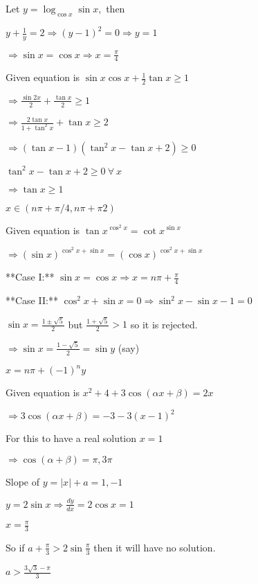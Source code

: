   Let $y = \log_{\cos x}\sin x,$ then

  $y + \frac{1}{y} = 2 \Rightarrow (y - 1)^2 = 0 \Rightarrow y = 1$

  $\Rightarrow \sin x = \cos x \Rightarrow x = \frac{\pi}{4}$

\item Given equation is $\sin x\cos x + \frac{1}{2}\tan x\geq 1$

  $\Rightarrow \frac{\sin 2x}{2} + \frac{\tan x}{2}\geq 1$

  $\Rightarrow \frac{2\tan x}{1 + \tan^2x} + \tan x \geq 2$

  $\Rightarrow (\tan x - 1)(\tan^2x - \tan x + 2)\geq 0$

  $\tan^2x - \tan x + 2\geq 0~\forall~x$

  $\Rightarrow \tan x \geq 1$

  $x\in\left(n\pi + \pi/4, n\pi + \pi2\right)$

\item Given equation is $\tan x^{\cos^2 x} = \cot x^{\sin x}$

  $\Rightarrow (\sin x)^{\cos^2x + \sin x} = (\cos x)^{\cos^2x + \sin x}$

  **Case I:** $\sin x = \cos x\Rightarrow x = n\pi +\frac{\pi}{4}$

  **Case II:** $\cos^2x + \sin x = 0 \Rightarrow \sin^2x - \sin x - 1 = 0$

  $\sin x = \frac{1\pm\sqrt{5}}{2}$ but $\frac{1 + \sqrt{5}}{2} > 1$ so it is rejected.

  $\Rightarrow \sin x = \frac{1 - \sqrt{5}}{2} = \sin y$ (say)

  $x = n\pi + (-1)^ny$

\item Given equation is $x^2 + 4 + 3\cos(\alpha x + \beta) = 2x$

  $\Rightarrow 3\cos(\alpha x + \beta) = -3 - 3(x - 1)^2$

  For this to have a real solution $x = 1$

  $\Rightarrow \cos(\alpha + \beta) = \pi, 3\pi$

\item Slope of $y = |x| + a = 1, -1$

  $y = 2\sin x \Rightarrow \frac{dy}{dx} = 2\cos x = 1$

  $x = \frac{\pi}{3}$

  So if $a + \frac{\pi}{3} > 2\sin\frac{\pi}{3}$ then it will have no solution.

  $a > \frac{3\sqrt{3} - \pi}{3}$
\stopitemize
